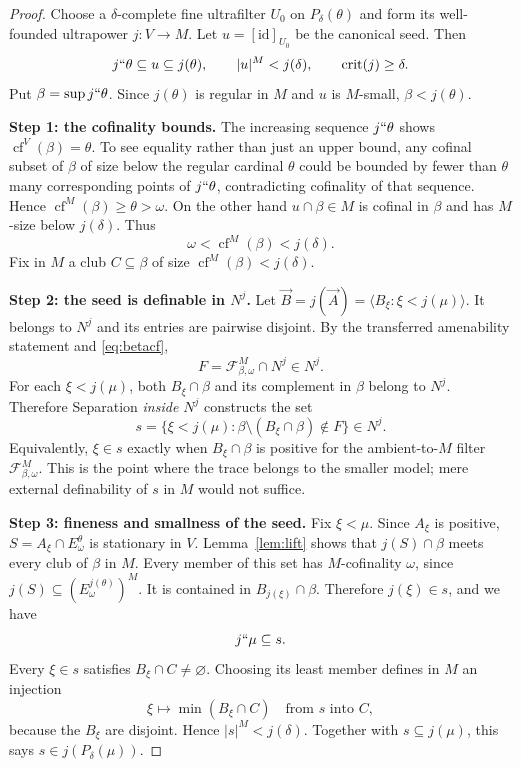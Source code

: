 \documentclass[11pt,letterpaper]{article}
\theoremstyle{definition}
\numberwithin{equation}{section}
\newcommand{\crit}{\operatorname{crit}}
\newcommand{\cf}{\operatorname{cf}}
\newcommand{\id}{\mathrm{id}}
\newcommand{\calF}{\mathcal F}
\begin{document}
\begin{proof}
Choose a $\delta$-complete fine ultrafilter $U_0$ on
$P_\delta(\theta)$ and form its well-founded ultrapower $j:V\to M$.
Let $u=[\id]_{U_0}$ be the canonical seed. Then
\begin{equation}\label{eq:bigseed}
j``\theta\subseteq u\subseteq j(\theta),
\qquad |u|^M<j(\delta),
\qquad \crit(j)\ge\delta.
\end{equation}
Put $\beta=\sup j``\theta$. Since $j(\theta)$ is regular in $M$ and
$u$ is $M$-small, $\beta<j(\theta)$.

\textbf{Step 1: the cofinality bounds.}
The increasing sequence $j``\theta$ shows $\cf^V(\beta)=\theta$.
To see equality rather than just an upper bound, any cofinal subset of
$\beta$ of size below the regular cardinal $\theta$ could be bounded
by fewer than $\theta$ many corresponding points of $j``\theta$,
contradicting cofinality of that sequence. Hence
$\cf^M(\beta)\ge\theta>\omega$.
On the other hand $u\cap\beta\in M$ is cofinal in $\beta$ and has
$M$-size below $j(\delta)$. Thus
\begin{equation}\label{eq:betacf}
\omega<\cf^M(\beta)<j(\delta).
\end{equation}
Fix in $M$ a club $C\subseteq\beta$ of size
$\cf^M(\beta)<j(\delta)$.

\textbf{Step 2: the seed is definable in $N^j$.}
Let $\vec B=j(\vec A)=\langle B_\xi:\xi<j(\mu)\rangle$.
It belongs to $N^j$ and its entries are pairwise disjoint. By the
transferred amenability statement and \eqref{eq:betacf},
\[
F=\calF^M_{\beta,\omega}\cap N^j\in N^j.
\]
For each $\xi<j(\mu)$, both $B_\xi\cap\beta$ and its complement
in $\beta$ belong to $N^j$. Therefore Separation \emph{inside $N^j$}
constructs the set
\begin{equation}\label{eq:smallseed}
s=\{\xi<j(\mu):\beta\setminus(B_\xi\cap\beta)\notin F\}\in N^j.
\end{equation}
Equivalently, $\xi\in s$ exactly when $B_\xi\cap\beta$ is positive
for the ambient-to-$M$ filter $\calF^M_{\beta,\omega}$.
This is the point where the trace belongs to the smaller model; mere
external definability of $s$ in $M$ would not suffice.

\textbf{Step 3: fineness and smallness of the seed.}
Fix $\xi<\mu$. Since $A_\xi$ is positive,
$S=A_\xi\cap E^\theta_\omega$ is stationary in $V$.
Lemma~\ref{lem:lift} shows that $j(S)\cap\beta$ meets every club of
$\beta$ in $M$. Every member of this set has $M$-cofinality $\omega$,
since $j(S)\subseteq(E^{j(\theta)}_\omega)^M$. It is contained in
$B_{j(\xi)}\cap\beta$. Therefore $j(\xi)\in s$, and we have
\begin{equation}\label{eq:seedfine}
j``\mu\subseteq s.
\end{equation}
Every $\xi\in s$ satisfies $B_\xi\cap C\ne\varnothing$. Choosing
its least member defines in $M$ an injection
\[
\xi\longmapsto\min(B_\xi\cap C)
\quad\text{from }s\text{ into }C,
\]
because the $B_\xi$ are disjoint. Hence $|s|^M<j(\delta)$.
Together with $s\subseteq j(\mu)$, this says
$s\in j(P_\delta(\mu))$.


\end{proof}
\end{document}
